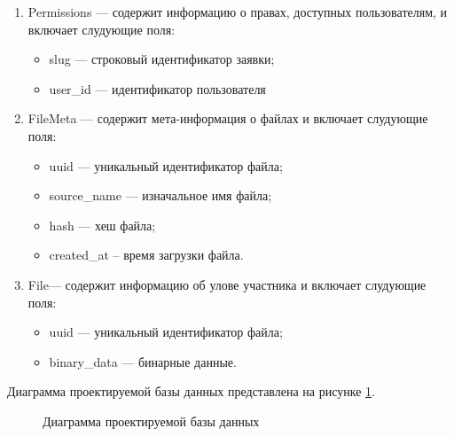\begin{enumerate}
	\item Permissions --- содержит информацию о правах, доступных пользователям, и включает слудующие поля:
	\begin{itemize}[label=---]
		\item slug --- строковый идентификатор заявки;
		\item user{\_}id --- идентификатор пользователя
	\end{itemize}
	
	\item FileMeta --- содержит мета-информация о файлах и включает слудующие поля:
	\begin{itemize}[label=---]
		\item uuid --- уникальный идентификатор файла;
		\item source{\_}name --- изначальное имя файла;
		\item hash --- хеш файла;
		\item created{\_}at -- время загрузки файла.
	\end{itemize}
	
	\item File--- содержит информацию об улове участника и включает слудующие поля:
	\begin{itemize}[label=---]
		\item uuid --- уникальный идентификатор файла;
		\item binary{\_}data --- бинарные данные.
	\end{itemize}
\end{enumerate}

Диаграмма проектируемой базы данных представлена на рисунке \ref{fig:er-2}.

\begin{figure}[h!]
	\caption{Диаграмма проектируемой базы данных}
	\label{fig:er-2}
\end{figure}

